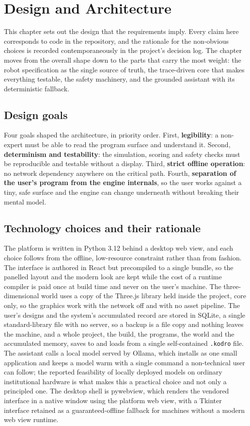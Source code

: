 \documentclass[11pt,a4paper]{report}
\begin{document}
\chapter{Design and Architecture}

This chapter sets out the design that the requirements imply. Every claim here corresponds to code in the repository, and the rationale for the non-obvious choices is recorded contemporaneously in the project's decision log. The chapter moves from the overall shape down to the parts that carry the most weight: the robot specification as the single source of truth, the trace-driven core that makes everything testable, the safety machinery, and the grounded assistant with its deterministic fallback.

\section{Design goals}
Four goals shaped the architecture, in priority order. First, \textbf{legibility}: a non-expert must be able to read the program surface and understand it. Second, \textbf{determinism and testability}: the simulation, scoring and safety checks must be reproducible and testable without a display. Third, \textbf{strict offline operation}: no network dependency anywhere on the critical path. Fourth, \textbf{separation of the user's program from the engine internals}, so the user works against a tiny, safe surface and the engine can change underneath without breaking their mental model.

\section{Technology choices and their rationale}
The platform is written in Python 3.12 behind a desktop web view, and each choice follows from the offline, low-resource constraint rather than from fashion. The interface is authored in React but precompiled to a single bundle, so the panelled layout and the modern look are kept while the cost of a runtime compiler is paid once at build time and never on the user's machine. The three-dimensional world uses a copy of the Three.js library held inside the project, core only, so the graphics work with the network off and with no asset pipeline. The user's designs and the system's accumulated record are stored in SQLite, a single standard-library file with no server, so a backup is a file copy and nothing leaves the machine, and a whole project, the build, the programs, the world and the accumulated memory, saves to and loads from a single self-contained \texttt{.kodro} file. The assistant calls a local model served by Ollama, which installs as one small application and keeps a model warm with a single command a non-technical user can follow; the reported feasibility of locally deployed models on ordinary institutional hardware \citep{reza2025} is what makes this a practical choice and not only a principled one. The desktop shell is pywebview, which renders the vendored interface in a native window using the platform web view, with a Tkinter interface retained as a guaranteed-offline fallback for machines without a modern web view runtime.
\end{document}
